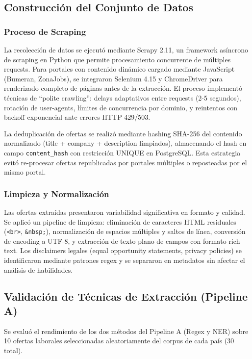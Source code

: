 \subsection{Construcción del Conjunto de Datos}

\subsubsection{Proceso de Scraping}

La recolección de datos se ejecutó mediante Scrapy 2.11, un framework asíncrono de scraping en Python que permite procesamiento concurrente de múltiples requests. Para portales con contenido dinámico cargado mediante JavaScript (Bumeran, ZonaJobs), se integraron Selenium 4.15 y ChromeDriver para renderizado completo de páginas antes de la extracción. El proceso implementó técnicas de ``polite crawling'': delays adaptativos entre requests (2-5 segundos), rotación de user-agents, límites de concurrencia por dominio, y reintentos con backoff exponencial ante errores HTTP 429/503.

La deduplicación de ofertas se realizó mediante hashing SHA-256 del contenido normalizado (title + company + description limpiados), almacenando el hash en campo \texttt{content\_hash} con restricción UNIQUE en PostgreSQL. Esta estrategia evitó re-procesar ofertas republicadas por portales múltiples o reposteadas por el mismo portal.

\subsubsection{Limpieza y Normalización}

Las ofertas extraídas presentaron variabilidad significativa en formato y calidad. Se aplicó un pipeline de limpieza: eliminación de caracteres HTML residuales (\texttt{<br>}, \texttt{\&nbsp;}), normalización de espacios múltiples y saltos de línea, conversión de encoding a UTF-8, y extracción de texto plano de campos con formato rich text. Los disclaimers legales (equal opportunity statements, privacy policies) se identificaron mediante patrones regex y se separaron en metadatos sin afectar el análisis de habilidades.

\subsection{Validación de Técnicas de Extracción (Pipeline A)}

Se evaluó el rendimiento de los dos métodos del Pipeline A (Regex y NER) sobre 10 ofertas laborales seleccionadas aleatoriamente del corpus de cada país (30 total).

